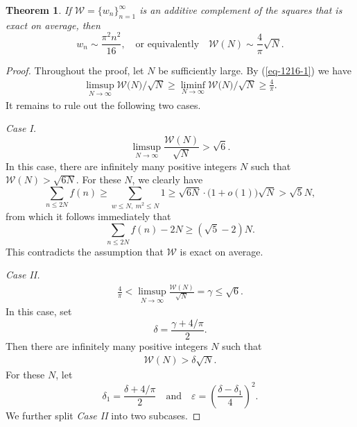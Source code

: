 \documentclass[12pt,a4paper,reqno]{amsart}
\numberwithin{equation}{section}
\theoremstyle{plain}
\newtheorem{theorem}{Theorem}
\theoremstyle{definition}
\begin{document}
\begin{theorem}\label{thm:3}
If $\mathcal{W}=\{w_n\}_{n=1}^{\infty}$ is an additive complement of the squares that is exact on average, then 
$$
w_n \sim \frac{\pi^2 n^2}{16},  \quad \text{or~equivalently} \quad \mathcal{W}(N)\sim \frac{4}{\pi}\sqrt{N}.
$$
\end{theorem}
\begin{proof}
Throughout the proof, let $N$ be sufficiently large. By (\ref{eq-1216-1}) we have
\begin{align*}
\limsup_{N\rightarrow\infty}\mathcal{W}\big(N\big)/\sqrt{N}\ge \liminf_{N\rightarrow\infty}\mathcal{W}\big(N\big)/\sqrt{N}\ge \frac{4}{\pi}.
\end{align*}
It remains to rule out the following two cases.

{\it Case I.} 
$$
\limsup_{N\rightarrow\infty}\frac{\mathcal{W}(N)}{\sqrt{N}}>\sqrt{6}.
$$
In this case, there are infinitely many positive integers $N$ such that
$
\mathcal{W}(N)>\sqrt{6N}.
$
For these $N$, we clearly have
$$
\sum_{n\le 2N}f(n)\ge \sum_{w\le N,\ m^2\le N}1\ge \sqrt{6N}\cdot \big(1+o(1)\big)\sqrt{N}>\sqrt{5}N,
$$
from which it follows immediately that
$$
\sum_{n\le 2N}f(n)-2N\ge (\sqrt{5}-2)N.
$$
This contradicts the assumption that $\mathcal{W}$ is exact on average.

{\it Case II.} 
\begin{align*}
\frac{4}{\pi}<\limsup_{N\rightarrow\infty}\frac{\mathcal{W}(N)}{\sqrt{N}}=\gamma\le \sqrt{6}.
\end{align*}
In this case, set 
$$
\delta=\frac{\gamma+4/\pi}{2}.
$$
Then there are infinitely many positive integers $N$ such that
\begin{align}\label{eq-1215-1}
\mathcal{W}(N)>\delta \sqrt{N}.
\end{align} 
For these $N$, let 
$$
\delta_1=\frac{\delta+4/\pi}{2} \quad \text{and} \quad \varepsilon=\left(\frac{\delta-\delta_1}{4}\right)^2.
$$ 
We further split {\it Case II} into two subcases.


\end{proof}
\end{document}
